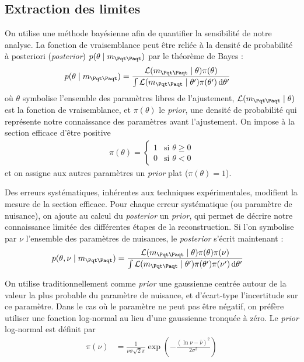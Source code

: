 \subsection{Extraction des limites}

On utilise une méthode bayésienne afin de quantifier la sensibilité de notre analyse. La fonction de vraisemblance peut être reliée à la densité de probabilité à posteriori (\emph{posterior}) $p(\theta \mid \mtt)$ par le théorème de Bayes :
\begin{align*}
  p(\theta \mid \mtt) &= \frac{\mathcal{L}(\mtt \mid \theta) \pi(\theta)}{\int{\mathcal{L}(\mtt \mid \theta^\prime) \pi(\theta^\prime) \, \mathrm{d}\theta^\prime}}
\end{align*}
où $\theta$ symbolise l'ensemble des paramètres libres de l'ajustement, $\mathcal{L}(\mtt \mid \theta)$ est la fonction de vraisemblance, et $\pi(\theta)$ le \emph{prior}, une densité de probabilité qui représente notre connaissance des paramètres avant l'ajustement. On impose à la section efficace d'être positive
\begin{align*}
\pi(\theta) = \begin{cases} 1 &\mbox{si } \theta \geq 0 \\
0 & \mbox{si } \theta < 0 \end{cases}
\end{align*}
et on assigne aux autres paramètres un \emph{prior} plat ($\pi(\theta) = 1$).

\medskip

Des erreurs systématiques, inhérentes aux techniques expérimentales, modifient la mesure de la section efficace. Pour chaque erreur systématique (ou paramètre de nuisance), on ajoute au calcul du \emph{posterior} un \emph{prior}, qui permet de décrire notre connaissance limitée des différentes étapes de la reconstruction. Si l'on symbolise par $\nu$ l'ensemble des paramètres de nuisances, le \emph{posterior} s'écrit maintenant :
\begin{align*}
  p(\theta, \nu \mid \mtt) &= \frac{\mathcal{L}(\mtt \mid \theta) \pi(\theta) \pi(\nu)}{\int{\mathcal{L}(\mtt \mid \theta^\prime) \pi(\theta^\prime) \pi(\nu^\prime) \, \mathrm{d}\theta^\prime}}
\end{align*}

On utilise traditionnellement comme \emph{prior} une gaussienne centrée autour de la valeur la plus probable du paramètre de nuisance, et d'écart-type l'incertitude sur ce paramètre. Dans le cas où le paramètre ne peut pas être négatif, on préfère utiliser une fonction log-normal au lieu d'une gaussienne tronquée à zéro. Le \emph{prior} log-normal est définit par
\begin{align*}
  \pi(\nu) &= \frac{1}{\nu \sigma \sqrt{2} \pi} \exp{\left( - \frac{\left( \ln\nu - \hat{\nu}\right)^2}{2 \sigma^2} \right)}
\end{align*}

